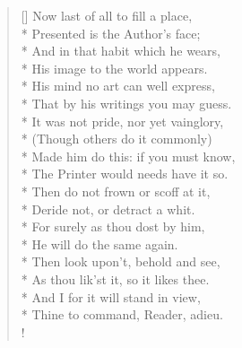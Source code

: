 \begin{verse}[\versewidth]
Now last of all to fill a place,\\*
Presented is the Author's face;\\*
And in that habit which he wears,\\*
His image to the world appears.\\*
His mind no art can well express,\\*
That by his writings you may guess.\\*
It was not pride, nor yet vainglory,\\*
(Though others do it commonly)\\*
Made him do this: if you must know,\\*
The Printer would needs have it so.\\*
Then do not frown or scoff at it,\\*
Deride not, or detract a whit.\\*
For surely as thou dost by him,\\*
He will do the same again.\\*
Then look upon't, behold and see,\\*
As thou lik'st it, so it likes thee.\\*
And I for it will stand in view,\\*
Thine to command, Reader, adieu.\\!
\end{verse}
